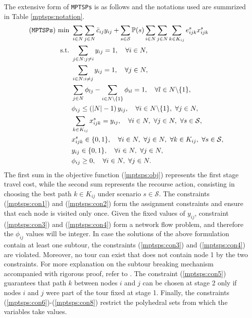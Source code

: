 The extensive form of \texttt{MPTSPs} is as follows and the notations used are summrized in Table \ref{mptsps:notation}.
\begin{subequations}
\begin{align}
(\texttt{MPTSPs})\ \textrm{min}\ &\sum_{i\in N}\sum_{j\in N}\bar{c}_{ij}y_{ij}+\sum_{s\in \mathcal{S}}\PP(s)\sum_{i\in N}\sum_{j\in N}\sum_{k\in K_{ij}}e_{ijk}^{s}x_{ijk}^{s} \label{mptsps:obj} \\ 
	\textrm{s.t.}\ &\sum_{j\in N:j\neq i}y_{ij}=1,\quad\forall i\in N, \label{mptsps:con1} \\ 
&\sum_{i\in N:i\neq j}y_{ij}=1,\quad\forall j\in N,\label{mptsps:con2} \\ 
&\sum_{j\in N}\phi_{lj}-\sum_{i\in N\backslash\{1\}}\phi_{il}=1,\quad\forall l\in N\backslash\{1\}, \label{mptsps:con3}  \\ 
&\phi_{ij}\le \left(|N|-1\right)y_{ij},\quad\forall i\in N\backslash\{1\},\ \forall j\in N,  \label{mptsps:con4} \\ 
&\sum_{k\in K_{ij}}x_{ijk}^{s}=y_{ij},\quad\forall i\in N,\ \forall j\in N,\ \forall s\in \mathcal{S}, \label{mptsps:con5} \\ 
&x_{ijk}^{s}\in\{0,1\},\quad\forall i\in N,\ \forall j\in N,\ \forall k\in K_{ij},\ \forall s\in \mathcal{S}, \label{mptsps:con6}  \\ 
&y_{ij}\in \{0,1\},\quad \forall i\in N,\ \forall j\in N, \label{mptsps:con7} \\ 
&\phi_{ij} \ge 0, \quad \forall i\in N,\ \forall j\in N. \label{mptsps:con8}
\end{align}
\end{subequations}
The first sum in the objective function (\ref{mptsps:obj}) represents the first stage travel cost, while the second sum represents the recourse action, consisting in choosing the best path $k\in K_{ij}$ under scenario $s\in\mathcal{S}$. The constraints (\ref{mptsps:con1}) and (\ref{mptsps:con2}) form the assignment constraints and ensure that each node is visited only once. Given the fixed values of $y_{ij}$, constraint (\ref{mptsps:con3}) and (\ref{mptsps:con4}) form a network flow problem, and therefore the $\phi_{ij}$ values will be integer. In case the solutions of the above formulation contain at least one subtour, the constraints (\ref{mptsps:con3}) and (\ref{mptsps:con4}) are violated. Moreover, no tour can exist that does not contain node 1 by the two constraints. For more explanation on the subtour breaking mechanism accompanied with rigorous proof, refer to \cite{journal:GG1978}. The constraint (\ref{mptsps:con5}) guarantees that path $k$ between nodes $i$ and $j$ can be chosen at stage 2 only if nodes $i$ and $j$ were part of the tour fixed at stage 1. Finally, the constraints (\ref{mptsps:con6})-(\ref{mptsps:con8}) restrict the polyhedral sets from which the variables take values.

